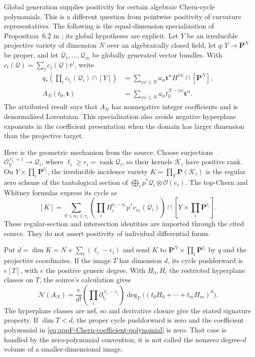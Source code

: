 Global generation supplies positivity for certain algebraic
Chern-cycle polynomials. This is a different question from
pointwise positivity of curvature representatives. The following
is the equal-dimension specialization of Proposition~6.2 in
\cite{CidRuiz26MixedSegreV2}; its global hypotheses are explicit.
Let $Y$ be an irreducible projective variety of dimension $N$
over an algebraically closed field, let $q:Y\to\mathbf P^N$
be proper, and let $\mathcal Q_1,\ldots,\mathcal Q_m$ be
globally generated vector bundles. With
$c_t(\mathcal Q)=\sum_j c_j(\mathcal Q)t^j$, write
\[
\begin{aligned}
 q_*\left(\prod_i c_{t_i}(\mathcal Q_i)\cap[Y]\right)
   &=\sum_{|\alpha|\leq N}
        a_\alpha\mathbf t^\alpha H^{|\alpha|}\cap[\mathbf P^N],\\
 A_N(t_0,\mathbf t)
   &=\sum_{|\alpha|\leq N}
        a_\alpha t_0^{N-|\alpha|}\mathbf t^\alpha.
\end{aligned}
\tag{F.21}\label{eq:appF-Chern-coefficient-polynomial}
\]
The attributed result says that $A_N$ has nonnegative integer
coefficients and is denormalized Lorentzian. This specialization
also avoids negative hyperplane exponents in the coefficient
presentation when the domain has larger dimension than the
projective target.

Here is the geometric mechanism from the source. Choose
surjections $\mathcal O_Y^{\ell_i+1}\to\mathcal Q_i$, where
$\ell_i\geq r_i=\operatorname{rank}\mathcal Q_i$, so their
kernels $\mathcal K_i$ have positive rank. On
$Y\times\prod_i\mathbf P^{\ell_i}$, the irreducible incidence
variety $K=\prod_Y\mathbf P(\mathcal K_i)$ is the regular
zero scheme of the tautological section of
$\bigoplus_i p^*\mathcal Q_i\otimes\mathcal O(e_i)$.
The top-Chern and Whitney formulas express its cycle as
\[
 [K]=\sum_{0\leq\alpha_i\leq r_i}
       \left(\prod_i H_i^{r_i-\alpha_i}
                       p^*c_{\alpha_i}(\mathcal Q_i)\right)
                         \cap[Y\times\prod_i\mathbf P^{\ell_i}].
\tag{F.22}\label{eq:appF-Chern-kernel-incidence}
\]
These regular-section and intersection identities are imported
through the cited source. They do not assert positivity of
individual differential forms.

Put $d=\dim K=N+\sum_i(\ell_i-r_i)$ and send $K$ to
$\mathbf P^N\times\prod_i\mathbf P^{\ell_i}$ by $q$ and
the projective coordinates. If the image $T$ has dimension
$d$, its cycle pushforward is $e[T]$, with $e$ the positive
generic degree. With $H_0,H_i$ the restricted hyperplane
classes on $T$, the source's calculation gives
\[
 \mathcal N(A_N)
  =\frac{e}{d!}\left(\prod_i\partial_{t_i}^{\ell_i-r_i}\right)
         \deg_T\bigl((t_0H_0+\cdots+t_mH_m)^d\bigr).
\tag{F.23}\label{eq:appF-Chern-volume-derivative}
\]
The hyperplane classes are nef, so
 and derivative closure
give the stated signature property. If $\dim T<d$, the
proper cycle pushforward is zero and the coefficient polynomial
in \eqref{eq:appF-Chern-coefficient-polynomial} is zero.
That case is handled by the zero-polynomial convention; it
is not called the nonzero degree-$d$ volume of a
smaller-dimensional image.

